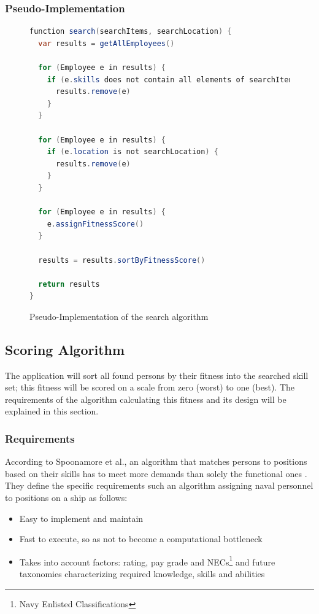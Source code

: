 \subsubsection{Pseudo-Implementation}
\begin{figure}[H]
\begin{lstlisting}[language=Java]
function search(searchItems, searchLocation) {
  var results = getAllEmployees()

  for (Employee e in results) {
    if (e.skills does not contain all elements of searchItems) {
      results.remove(e)
    }
  }

  for (Employee e in results) {
    if (e.location is not searchLocation) {
      results.remove(e)
    }
  }

  for (Employee e in results) {
    e.assignFitnessScore()
  }

  results = results.sortByFitnessScore()

  return results
}
\end{lstlisting}
\caption[Pseudocode: Search Algorithm]{Pseudo-Implementation of the search algorithm}
\end{figure}

\newpage

\subsection{Scoring Algorithm}
\label{fitscorealg}
The application will sort all found persons by their fitness into the searched skill set; this fitness will be scored on a scale from zero (worst) to one (best).
The requirements of the algorithm calculating this fitness and its design will be explained in this section.

\subsubsection{Requirements}
According to Spoonamore et al., an algorithm that matches persons to positions based on their skills has to meet more demands than solely the functional ones \cite[P. 14]{USN}. They define the specific requirements such an algorithm assigning naval personnel to positions on a ship as follows:
\begin{itemize}
  \item Easy to implement and maintain
  \item Fast to execute, so as not to become a computational bottleneck
  \item Takes into account factors: rating, pay grade and NECs\footnote{Navy Enlisted Classifications} and future taxonomies characterizing required knowledge, skills and abilities
\end{itemize}

